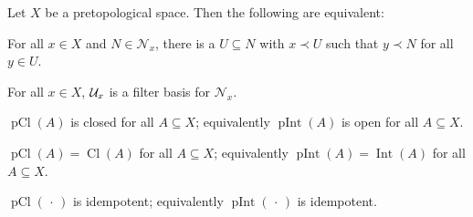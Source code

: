 \documentclass[article, a4paper, 11pt, oneside]{memoir}
\numberwithin{equation}{chapter}
\newcommand{\inpoint}{\prec}
\newcommand{\calN}{\mathcal{N}}
\newcommand{\nhoods}[1]{\calN_{#1}}
\newcommand{\pInt}[1]{\operatorname{pInt}(#1)}
\newcommand{\pCl}[1]{\operatorname{pCl}(#1)}
\renewcommand{\interior}[1]{\operatorname{Int}(#1)}
\renewcommand{\closure}[1]{\operatorname{Cl}(#1)}
\begin{document}
\begin{proposition}
    \label{thm:topology-equivalent-properties}
    Let $X$ be a pretopological space. Then the following are equivalent:
    \begin{enumprop}
        \item \label{enum:topology-filterbasis-intuition} For all $x \in X$ and $N \in \nhoods{x}$, there is a $U \subseteq N$ with $x \inpoint U$ such that $y \inpoint N$ for all $y \in U$.
        
        \item \label{enum:topology-filterbasis} For all $x \in X$, $\mathcal{U}_{x}$ is a filter basis for $\nhoods{x}$.
        
        \item \label{enum:topology-preclosure-always-closed} $\pCl{A}$ is closed for all $A \subseteq X$; equivalently $\pInt{A}$ is open for all $A \subseteq X$.
        
        \item \label{enum:topology-preclosure-closure-equal} $\pCl{A} = \closure{A}$ for all $A \subseteq X$; equivalently $\pInt{A} = \interior{A}$ for all $A \subseteq X$.
        
        \item \label{enum:topology-idempotence} $\pCl{\,\cdot\,}$ is idempotent; equivalently $\pInt{\,\cdot\,}$ is idempotent.
    \end{enumprop}
\end{proposition}
\end{document}
